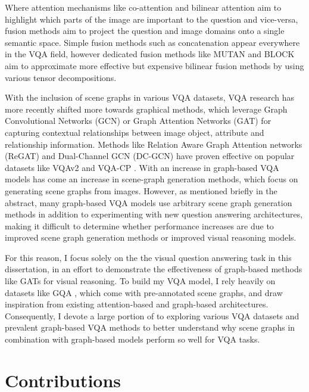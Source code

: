 Where attention mechanisms like co-attention and bilinear attention aim to highlight which parts of the image are important to the question and vice-versa, fusion methods aim to project the question and image domains onto a single semantic space. Simple fusion methods such as concatenation appear everywhere in the VQA field, however dedicated fusion methods like MUTAN \cite{ben2017mutan} and BLOCK \cite{ben2019block} aim to approximate more effective but expensive bilinear fusion methods by using various tensor decompositions.

With the inclusion of scene graphs in various VQA datasets, VQA research has more recently shifted more towards graphical methods, which leverage Graph Convolutional Networks (GCN) \cite{kipf2016semi} or Graph Attention Networks (GAT) \cite{velivckovic2017graph} for capturing contextual relationships between image object, attribute and relationship information. Methods like Relation Aware Graph Attention networks (ReGAT) \cite{li2019relation} and Dual-Channel GCN (DC-GCN) \cite{huang2020aligned} have proven effective on popular datasets like VQAv2 \cite{goyal2017making} and VQA-CP \cite{agrawal2018dont}. With an increase in graph-based VQA models has come an increase in scene-graph generation methods, which focus on generating scene graphs from images. However, as mentioned briefly in the abstract, many graph-based VQA models use arbitrary scene graph generation methods in addition to experimenting with new question answering architectures, making it difficult to determine whether performance increases are due to improved scene graph generation methods or improved visual reasoning models.

For this reason, I focus solely on the the visual question answering task in this dissertation, in an effort to demonstrate the effectiveness of graph-based methods like GATs for visual reasoning. To build my VQA model, I rely heavily on datasets like GQA \cite{hudson2018compositional}, which come with pre-annotated scene graphs, and draw inspiration from existing attention-based and graph-based architectures. Consequently, I devote a large portion of \chapterautorefname{ \ref{chapter:literature}} to exploring various VQA datasets and prevalent graph-based VQA methods to better understand why scene graphs in combination with graph-based models perform so well for VQA tasks.

\section{Contributions}

